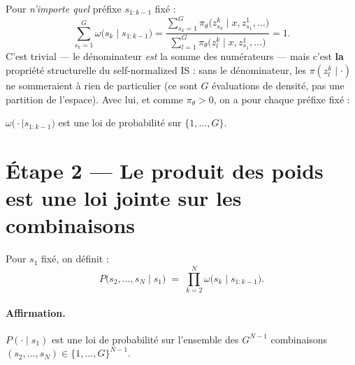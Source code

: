 \documentclass{article}
\newcommand{\pref}[2]{s_{#1:#2}}                     %
\newcommand{\w}[2]{\omega\big(#1 \mid #2\big)}       %
\begin{document}
Pour \emph{n'importe quel} préfixe $\pref{1}{k-1}$ fixé :
\begin{equation}
\sum_{s_k=1}^{G} \w{s_k}{\pref{1}{k-1}}
= \frac{\sum_{s_k=1}^{G} \pi_\theta\big(z^k_{s_k} \mid x, z^1_{s_1},\ldots\big)}
       {\sum_{l=1}^{G} \pi_\theta\big(z^k_{l} \mid x, z^1_{s_1},\ldots\big)}
= 1.
\label{eq:normalisation}
\end{equation}
C'est trivial --- le dénominateur \emph{est} la somme des numérateurs --- mais c'est
\textbf{la} propriété structurelle du self-normalized IS : sans le dénominateur, les
$\pi(z^k_l \mid \cdot)$ ne sommeraient à rien de particulier (ce sont $G$
évaluations de densité, pas une partition de l'espace). Avec lui, et comme
$\pi_\theta > 0$, on a pour chaque préfixe fixé :
\begin{center}
$\w{\cdot}{\pref{1}{k-1}}$ est une loi de probabilité sur $\{1, \ldots, G\}$.
\end{center}

\section{Étape 2 --- Le produit des poids est une loi jointe sur les combinaisons}

Pour $s_1$ fixé, on définit :
\begin{equation}
P\big(s_2, \ldots, s_N \mid s_1\big)
\;=\;
\prod_{k=2}^{N} \w{s_k}{\pref{1}{k-1}}.
\label{eq:loiP}
\end{equation}

\paragraph{Affirmation.} $P(\cdot \mid s_1)$ est une loi de probabilité sur
l'ensemble des $G^{N-1}$ combinaisons $(s_2,\ldots,s_N) \in \{1,\ldots,G\}^{N-1}$.
\end{document}
